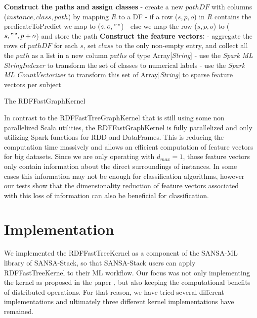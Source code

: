\documentclass{easychair}
\begin{document}
\begin{algorithm}
 \label{alg:FastGK}
 \;

\textbf{Construct the paths and assign classes}\; \Indp
- create a new $pathDF$ with columns ($instance,class,path$) by mapping $R$ to a DF\; \Indp
- if a row ($s,p,o$) in $R$ contains the predicateToPredict we map to ($s,o,""$)\;
- else we map the row ($s,p,o$) to ($s,"",p+o$) and store the path\; \Indm \Indm
 \;
 \textbf{Construct the feature vectors:}\; \Indp
 - aggregate the rows of $pathDF$ for each $s$, set $class$ to the only non-empty entry, and collect all the $path$ as a list in a new column $paths$ of type Array[\textit{String}]\;
 - use the \textit{Spark ML StringIndexer} to transform the set of classes to numerical labels\;
 - use the \textit{Spark ML CountVectorizer} to transform this set of Array[\textit{String}] to sparse feature vectors per subject\;
\caption{The RDFFastGraphKernel}
\end{algorithm}

In contrast to the RDFFastTreeGraphKernel that is still using some non parallelized Scala utilities, the RDFFastGraphKernel is fully parallelized and only utilizing Spark functions for RDD and DataFrames. This is reducing the computation time massively and allows an efficient computation of feature vectors for big datasets. Since we are only operating with $d_{max}=1$, those feature vectors only contain information about the direct surroundings of instances. In some cases this information may not be enough for classification algorithms, however our tests show that the dimensionality reduction of feature vectors associated with this loss of information can also be beneficial for classification.
\section{Implementation}
\label{sect:Implementation}

We implemented the RDFFastTreeKernel as a component of the SANSA-ML library of SANSA-Stack, so that SANSA-Stack users can apply RDFFastTreeKernel to their ML workflow. Our focus was not only implementing the kernel as proposed in the paper \cite{FGK}, but also keeping the computational benefits of distributed operations. For that reason, we have tried several different implementations and ultimately three different kernel implementations have remained.
\end{document}
